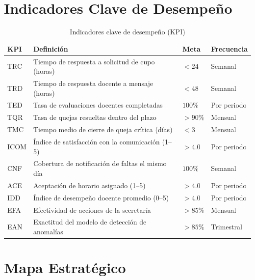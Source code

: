 \section{Indicadores Clave de Desempeño}

\begin{table}[H]
\centering
\caption{Indicadores clave de desempeño (\ac{KPI})}
\label{tab:kpis}
\small
\begin{tabularx}{\textwidth}{@{}p{1.5cm} X p{1.7cm} p{2.0cm}@{}}
\toprule
\rowcolor{azulClaro}
\textbf{KPI} & \textbf{Definición} & \textbf{Meta} & \textbf{Frecuencia} \\
\midrule
TRC & Tiempo de respuesta a solicitud de cupo (horas) & $<24$ & Semanal \\
TRD & Tiempo de respuesta docente a mensaje (horas) & $<48$ & Semanal \\
TED & Tasa de evaluaciones docentes completadas & $100\%$ & Por periodo \\
TQR & Tasa de quejas resueltas dentro del plazo & $>90\%$ & Mensual \\
TMC & Tiempo medio de cierre de queja crítica (días) & $<3$ & Mensual \\
ICOM & Índice de satisfacción con la comunicación (1--5) & $>4.0$ & Por periodo \\
CNF & Cobertura de notificación de faltas el mismo día & $100\%$ & Semanal \\
ACE & Aceptación de horario asignado (1--5) & $>4.0$ & Por periodo \\
IDD & Índice de desempeño docente promedio (0--5) & $>4.0$ & Por periodo \\
EFA & Efectividad de acciones de la secretaría & $>85\%$ & Mensual \\
EAN & Exactitud del modelo de detección de anomalías & $>85\%$ & Trimestral \\
\bottomrule
\end{tabularx}
\end{table}

\section{Mapa Estratégico}

